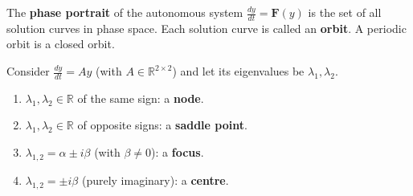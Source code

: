 \begin{definition}\label{def:phase_portrait}
The \textbf{phase portrait} of the autonomous system $\frac{dy}{dt} = \mathbf{F}(y)$ is the set of all solution curves in phase space. Each solution curve is called an \textbf{orbit}. A periodic orbit is a closed orbit.
\end{definition}

\begin{theorem}\label{thm:linear_phase_portrait}
Consider $\frac{dy}{dt} = A y$ (with $A \in \mathbb{R}^{2 \times 2}$) and let its eigenvalues be $\lambda_1, \lambda_2$.
\begin{enumerate}[label=(\roman*)]
    \item $\lambda_1, \lambda_2 \in \mathbb{R}$ of the same sign: a \textbf{node}.
    \item $\lambda_1, \lambda_2 \in \mathbb{R}$ of opposite signs: a \textbf{saddle point}.
    \item $\lambda_{1,2} = \alpha \pm i\beta$ (with $\beta \neq 0$): a \textbf{focus}.
    \item $\lambda_{1,2} = \pm i\beta$ (purely imaginary): a \textbf{centre}.
\end{enumerate}
\end{theorem}

